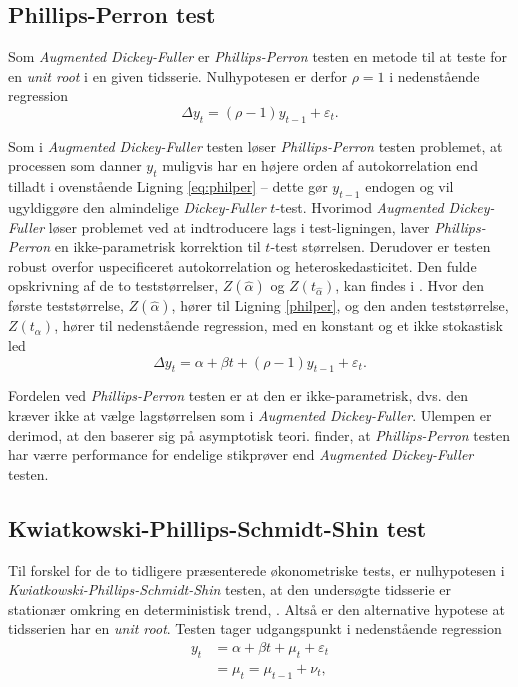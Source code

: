 \documentclass[
  a4paper,
  oneside]{memoir}
\begin{document}
\hypertarget{phillips-perron-test}{%
\subsection{Phillips-Perron test}\label{phillips-perron-test}}

Som \emph{Augmented Dickey-Fuller} er \emph{Phillips-Perron} testen en metode til at teste for en \emph{unit root} i en given tidsserie. Nulhypotesen er derfor \(\rho=1\) i nedenstående regression
\begin{equation}
\Delta y_t = (\rho-1) y_{t-1} + \varepsilon_t.\label{eq:philper}
\end{equation}

Som i \emph{Augmented Dickey-Fuller} testen løser \emph{Phillips-Perron} testen problemet, at processen som danner \(y_t\) muligvis har en højere orden af autokorrelation end tilladt i ovenstående Ligning \eqref{eq:philper} -- dette gør \(y_{t-1}\) endogen og vil ugyldiggøre den almindelige \emph{Dickey-Fuller} \(t\)-test. Hvorimod \emph{Augmented Dickey-Fuller} løser problemet ved at indtroducere lags i test-ligningen, laver \emph{Phillips-Perron} en ikke-parametrisk korrektion til \(t\)-test størrelsen. Derudover er testen robust overfor uspecificeret autokorrelation og heteroskedasticitet. Den fulde opskrivning af de to teststørrelser, \(Z(\hat{\alpha})\) og \(Z(t_{\hat{\alpha}})\), kan findes i \citep{Phillips1988}. Hvor den første teststørrelse, \(Z(\hat{\alpha})\), hører til Ligning \ref{philper}, og den anden teststørrelse, \(Z(t_{\hat{\alpha}})\), hører til nedenstående regression, med en konstant og et ikke stokastisk led
\[\Delta y_t =\alpha + \beta t + (\rho-1) y_{t-1} + \varepsilon_t.\]

Fordelen ved \emph{Phillips-Perron} testen er at den er ikke-parametrisk, dvs. den kræver ikke at vælge lagstørrelsen som i \emph{Augmented Dickey-Fuller}. Ulempen er derimod, at den baserer sig på asymptotisk teori. \citep{Davidson2004} finder, at \emph{Phillips-Perron} testen har værre performance for endelige stikprøver end \emph{Augmented Dickey-Fuller} testen.

\hypertarget{kwiatkowski-phillips-schmidt-shin-test}{%
\subsection{Kwiatkowski-Phillips-Schmidt-Shin test}\label{kwiatkowski-phillips-schmidt-shin-test}}

Til forskel for de to tidligere præsenterede økonometriske tests, er nulhypotesen i \emph{Kwiatkowski-Phillips-Schmidt-Shin} testen, at den undersøgte tidsserie er stationær omkring en deterministisk trend, \citep{Kwiatkowski1992}. Altså er den alternative hypotese at tidsserien har en \emph{unit root}. Testen tager udgangspunkt i nedenstående regression
\begin{align}
y_t&=\alpha+\beta t + \mu_t+\varepsilon_t\\
&=\mu_t=\mu_{t-1}+\nu_t,
\end{align}
\end{document}
